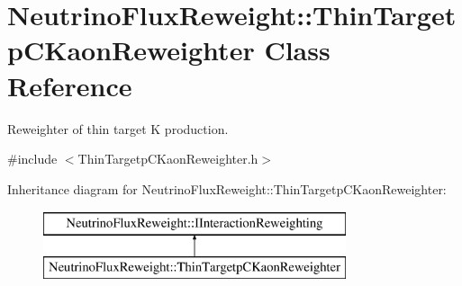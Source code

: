 \hypertarget{class_neutrino_flux_reweight_1_1_thin_targetp_c_kaon_reweighter}{\section{Neutrino\-Flux\-Reweight\-:\-:Thin\-Targetp\-C\-Kaon\-Reweighter Class Reference}
\label{class_neutrino_flux_reweight_1_1_thin_targetp_c_kaon_reweighter}
}


Reweighter of thin target K production.  




{\ttfamily \#include $<$Thin\-Targetp\-C\-Kaon\-Reweighter.\-h$>$}

Inheritance diagram for Neutrino\-Flux\-Reweight\-:\-:Thin\-Targetp\-C\-Kaon\-Reweighter\-:\begin{figure}[H]
\begin{center}
\leavevmode
\includegraphics[height=2.000000cm]{class_neutrino_flux_reweight_1_1_thin_targetp_c_kaon_reweighter}
\end{center}
\end{figure}
